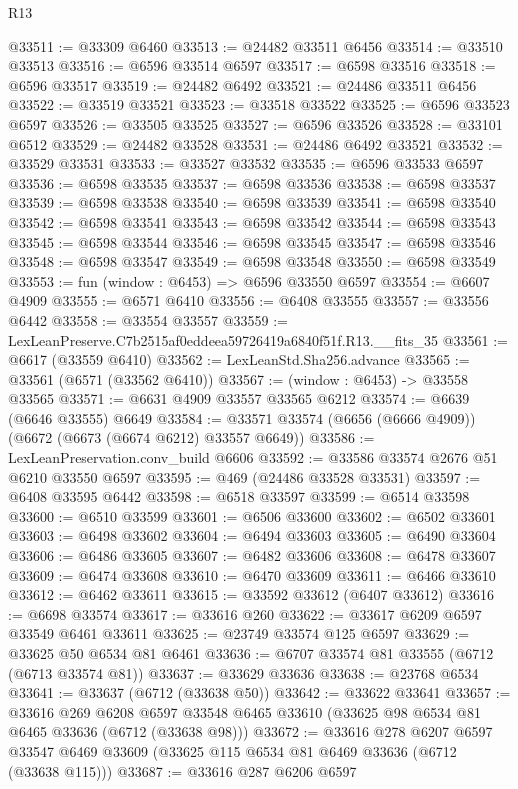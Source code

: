 \begin{lexlean}{R13}
\begin{coremodule}
@33511 := @33309 @6460
@33513 := @24482 @33511 @6456
@33514 := @33510 @33513
@33516 := @6596 @33514 @6597
@33517 := @6598 @33516
@33518 := @6596 @33517
@33519 := @24482 @6492
@33521 := @24486 @33511 @6456
@33522 := @33519 @33521
@33523 := @33518 @33522
@33525 := @6596 @33523 @6597
@33526 := @33505 @33525
@33527 := @6596 @33526
@33528 := @33101 @6512
@33529 := @24482 @33528
@33531 := @24486 @6492 @33521
@33532 := @33529 @33531
@33533 := @33527 @33532
@33535 := @6596 @33533 @6597
@33536 := @6598 @33535
@33537 := @6598 @33536
@33538 := @6598 @33537
@33539 := @6598 @33538
@33540 := @6598 @33539
@33541 := @6598 @33540
@33542 := @6598 @33541
@33543 := @6598 @33542
@33544 := @6598 @33543
@33545 := @6598 @33544
@33546 := @6598 @33545
@33547 := @6598 @33546
@33548 := @6598 @33547
@33549 := @6598 @33548
@33550 := @6598 @33549
@33553 := fun (window : @6453) => @6596 @33550 @6597
@33554 := @6607 @4909
@33555 := @6571 @6410
@33556 := @6408 @33555
@33557 := @33556 @6442
@33558 := @33554 @33557
@33559 := LexLeanPreserve.C7b2515af0eddeea59726419a6840f51f.R13.__fits_35
@33561 := @6617 (@33559 @6410)
@33562 := LexLeanStd.Sha256.advance
@33565 := @33561 (@6571 (@33562 @6410))
@33567 := (window : @6453) -> @33558 @33565
@33571 := @6631 @4909 @33557 @33565 @6212
@33574 := @6639 (@6646 @33555) @6649
@33584 := @33571 @33574 (@6656 (@6666 @4909)) (@6672 (@6673 (@6674 @6212) @33557 @6649))
@33586 := LexLeanPreservation.conv_build @6606
@33592 := @33586 @33574 @2676 @51 @6210 @33550 @6597
@33595 := @469 (@24486 @33528 @33531)
@33597 := @6408 @33595 @6442
@33598 := @6518 @33597
@33599 := @6514 @33598
@33600 := @6510 @33599
@33601 := @6506 @33600
@33602 := @6502 @33601
@33603 := @6498 @33602
@33604 := @6494 @33603
@33605 := @6490 @33604
@33606 := @6486 @33605
@33607 := @6482 @33606
@33608 := @6478 @33607
@33609 := @6474 @33608
@33610 := @6470 @33609
@33611 := @6466 @33610
@33612 := @6462 @33611
@33615 := @33592 @33612 (@6407 @33612)
@33616 := @6698 @33574
@33617 := @33616 @260
@33622 := @33617 @6209 @6597 @33549 @6461 @33611
@33625 := @23749 @33574 @125 @6597
@33629 := @33625 @50 @6534 @81 @6461
@33636 := @6707 @33574 @81 @33555 (@6712 (@6713 @33574 @81))
@33637 := @33629 @33636
@33638 := @23768 @6534
@33641 := @33637 (@6712 (@33638 @50))
@33642 := @33622 @33641
@33657 := @33616
    @269
    @6208
    @6597
    @33548
    @6465
    @33610
    (@33625 @98 @6534 @81 @6465 @33636 (@6712 (@33638 @98)))
@33672 := @33616
    @278
    @6207
    @6597
    @33547
    @6469
    @33609
    (@33625 @115 @6534 @81 @6469 @33636 (@6712 (@33638 @115)))
@33687 := @33616
    @287
    @6206
    @6597

\end{coremodule}
\end{lexlean}
